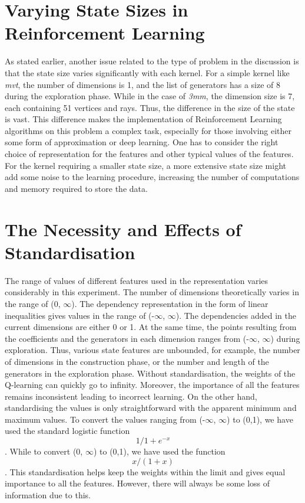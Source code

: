 \documentclass[logo,msc]{infthesis}           %
\begin{document}
\section{Varying State Sizes in Reinforcement Learning}
As stated earlier, another issue related to the type of problem in the discussion is that the state size varies significantly with each kernel. For a simple kernel like \textit{mvt}, the number of dimensions is 1, and the list of generators has a size of 8 during the exploration phase. While in the case of \textit{3mm}, the dimension size is 7, each containing 51 vertices and rays. Thus, the difference in the size of the state is vast. This difference makes the implementation of Reinforcement Learning algorithms on this problem a complex task, especially for those involving either some form of approximation or deep learning. One has to consider the right choice of representation for the features and other typical values of the features. For the kernel requiring a smaller state size, a more extensive state size might add some noise to the learning procedure, increasing the number of computations and memory required to store the data.

\section{The Necessity and Effects of Standardisation}
\label{sec:std}
The range of values of different features used in the representation varies considerably in this experiment. The number of dimensions theoretically varies in the range of (0, $\infty$). The dependency representation in the form of linear inequalities gives values in the range of (-$\infty$, $\infty$). The dependencies added in the current dimensions are either 0 or 1. At the same time, the points resulting from the coefficients and the generators in each dimension ranges from (-$\infty$, $\infty$) during exploration. Thus, various state features are unbounded, for example, the number of dimensions in the construction phase, or the number and length of the generators in the exploration phase. Without standardisation, the weights of the Q-learning can quickly go to infinity. Moreover, the importance of all the features remains inconsistent leading to incorrect learning. On the other hand, standardising the values is only straightforward with the apparent minimum and maximum values. To convert the values ranging from (-$\infty$, $\infty$) to (0,1), we have used the standard logistic function \[{1/1+e^{-x}}\]. While to convert (0, $\infty$) to (0,1), we have used the function \[{x / (1 + x)}\]. This standardisation helps keep the weights within the limit and gives equal importance to all the features. However, there will always be some loss of information due to this.
\end{document}
